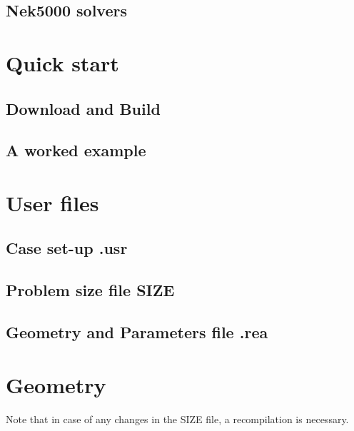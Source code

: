 \documentclass[11pt]{report}              %
\begin{document}
\section{Nek5000 solvers}\label{sec:ns_eqns}

%

\chapter{Quick start}
\section{Download and Build}

\section{A worked example}


\chapter{User files}
\section{Case set-up .usr}

\section{Problem size file SIZE}

\section{Geometry and Parameters file .rea}




\chapter{Geometry}\label{sec:geom}

Note that in case of any changes in the SIZE file, a recompilation is necessary.\\
\end{document}
